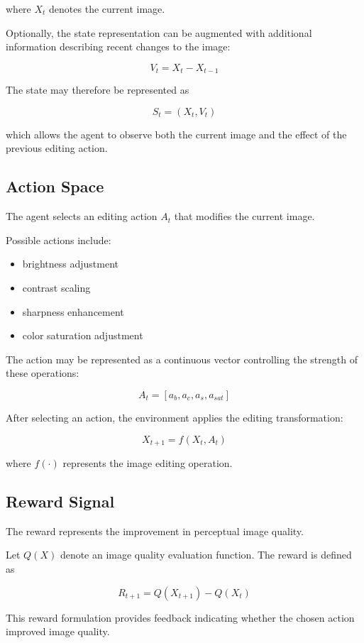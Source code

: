 \documentclass[11pt]{article}
\begin{document}
where $X_t$ denotes the current image.

Optionally, the state representation can be augmented with additional information describing recent changes to the image:

\[
V_t = X_t - X_{t-1}
\]

The state may therefore be represented as

\[
S_t = (X_t, V_t)
\]

which allows the agent to observe both the current image and the effect of the previous editing action.

\subsection{Action Space}

The agent selects an editing action $A_t$ that modifies the current image.

Possible actions include:

\begin{itemize}
\item brightness adjustment
\item contrast scaling
\item sharpness enhancement
\item color saturation adjustment
\end{itemize}

The action may be represented as a continuous vector controlling the strength of these operations:

\[
A_t = [a_b, a_c, a_s, a_{sat}]
\]

After selecting an action, the environment applies the editing transformation:

\[
X_{t+1} = f(X_t, A_t)
\]

where $f(\cdot)$ represents the image editing operation.

\subsection{Reward Signal}

The reward represents the improvement in perceptual image quality.

Let $Q(X)$ denote an image quality evaluation function. The reward is defined as

\[
R_{t+1} = Q(X_{t+1}) - Q(X_t)
\]

This reward formulation provides feedback indicating whether the chosen action improved image quality.
\end{document}
